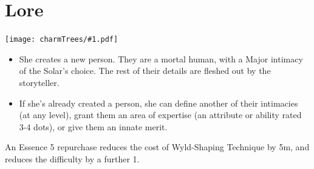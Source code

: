 \documentclass[oneside]{book}
\newenvironment{Ability}[1]{%
  \section{#1}%
  \vspace{-0.25in}\texttt{[image: charmTrees/\#1.pdf]}%
  \begin{multicols}{2}
}
{
  \end{multicols}
}
\begin{document}
\begin{Ability}{Lore}
  \begin{itemize}
    \item She creates a new person. They are a mortal human, with a Major intimacy of the Solar's choice. The rest of their details are fleshed out by the storyteller.
    \item If she's already created a person, she can define another of their intimacies (at any level), grant them an area of expertise (an attribute or ability rated 3-4 dots), or give them an innate merit.
  \end{itemize}

  An Essence 5 repurchase reduces the cost of Wyld-Shaping Technique by 5m, and reduces the difficulty by a further 1.

\end{Ability}
\end{document}
